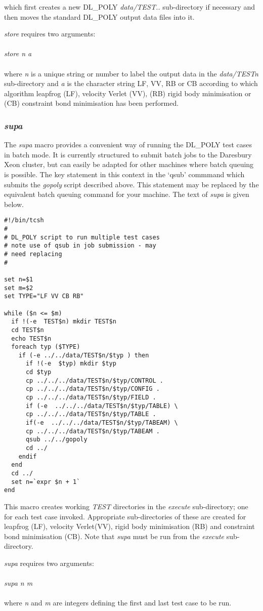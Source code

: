 \noindent which first creates a new DL\_POLY {\em data/TEST..}
sub-directory if necessary and then moves the
standard DL\_POLY output data files into it.

{\sl store} requires two arguments:\\~\\
{\sl store n a}\\~\\
\noindent where {\sl n} is a unique string or number to label the
output data in the {\em data/TESTn} sub-directory and {\sl a} is the
character string LF, VV, RB or CB according to which algorithm
leapfrog (LF), velocity Verlet (VV), (RB) rigid body minimisation or
(CB) constraint bond minimisation has been performed.

\subsubsection{{\sl supa}}
The {\sl supa} macro provides a convenient way of running the DL\_POLY test
cases in batch mode. It is currently structured to submit batch jobs to the
Daresbury Xeon cluster, but can easily be adapted for other machines where
batch queuing is possible. The key statement in this context in the `qsub'
commmand which submits the {\sl gopoly} script described above. This statement
may be replaced by the equivalent batch queuing command for your machine. The
text of {\sl supa} is given below.
\begin{verbatim}
#!/bin/tcsh
#
# DL_POLY script to run multiple test cases
# note use of qsub in job submission - may
# need replacing
#

set n=$1
set m=$2
set TYPE="LF VV CB RB"

while ($n <= $m)
  if !(-e  TEST$n) mkdir TEST$n
  cd TEST$n
  echo TEST$n
  foreach typ ($TYPE)
    if (-e ../../data/TEST$n/$typ ) then
      if !(-e  $typ) mkdir $typ
      cd $typ
      cp ../../../data/TEST$n/$typ/CONTROL .
      cp ../../../data/TEST$n/$typ/CONFIG .
      cp ../../../data/TEST$n/$typ/FIELD .
      if (-e  ../../../data/TEST$n/$typ/TABLE) \
      cp ../../../data/TEST$n/$typ/TABLE .
      if(-e  ../../../data/TEST$n/$typ/TABEAM) \
      cp ../../../data/TEST$n/$typ/TABEAM .
      qsub ../../gopoly
      cd ../
    endif
  end
  cd ../
  set n=`expr $n + 1`
end
\end{verbatim}

\noindent This macro creates working {\em TEST} directories in 
the {\em execute} sub-directory; one for each
test case invoked. Appropriate sub-directories of these are created for
leapfrog (LF), velocity Verlet(VV), rigid body minimisation (RB) and
constraint bond minimisation (CB). Note that {\sl supa} must be run
from the {\em execute} sub-directory.

{\sl supa} requires two arguments:\\~\\
{\sl supa n m}\\~\\
\noindent where {\sl n} and {\sl m} are integers defining the first
and last test case to be run.
\clearpage

